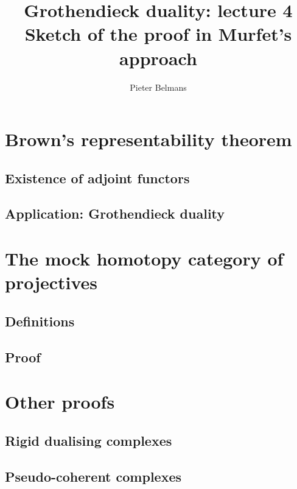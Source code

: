\documentclass[10pt,a4paper]{article}
\title{Grothendieck duality: lecture 4 \\[.2em] \Large Sketch of the proof in Murfet's approach}
\author{Pieter Belmans}
\begin{document}
\maketitle

\begin{abstract}
  
\end{abstract}

\section{Brown's representability theorem}
\label{section:neeman}
\subsection{Existence of adjoint functors}

\subsection{Application: Grothendieck duality}

\section{The mock homotopy category of projectives}
\label{section:murfet}
\subsection{Definitions}
\label{subsection:definitions}

\subsection{Proof}
\label{subsection:proof}

\section{Other proofs}
\label{section:other}
\subsection{Rigid dualising complexes}
\label{subsection:yekutieli-zhang}

\subsection{Pseudo-coherent complexes}
\label{subsection:lipman}


\tableofcontents

\printbibliography
\end{document}
